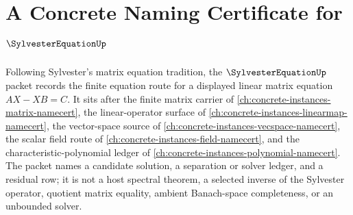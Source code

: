 \chapter{A Concrete Naming Certificate for $\SylvesterEquationUp$}
\label{ch:concrete-instances-sylvester-equation-namecert}

Following Sylvester's matrix equation tradition, the $\SylvesterEquationUp$ packet records the finite equation route for a displayed linear matrix equation $AX-XB=C$. It sits after the finite matrix carrier of \autoref{ch:concrete-instances-matrix-namecert}, the linear-operator surface of \autoref{ch:concrete-instances-linearmap-namecert}, the vector-space source of \autoref{ch:concrete-instances-vecspace-namecert}, the scalar field route of \autoref{ch:concrete-instances-field-namecert}, and the characteristic-polynomial ledger of \autoref{ch:concrete-instances-polynomial-namecert}. The packet names a candidate solution, a separation or solver ledger, and a residual row; it is not a host spectral theorem, a selected inverse of the Sylvester operator, quotient matrix equality, ambient Banach-space completeness, or an unbounded solver.

